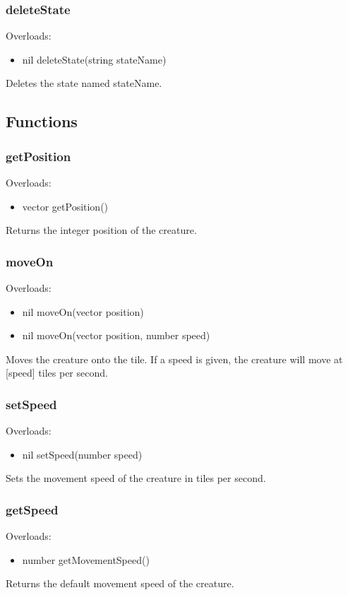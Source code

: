 \documentclass{book}
\newenvironment{ulist}
	{\begin{itemize}
			\itemsep0em}
	{\end{itemize}}
\begin{document}
\subsubsection{deleteState}
Overloads:
\begin{ulist}
	\item nil deleteState(string stateName)
\end{ulist}
Deletes the state named stateName.

\subsection{Functions}
\subsubsection{getPosition}
Overloads:
\begin{ulist}
	\item vector getPosition()
\end{ulist}
Returns the integer position of the creature.

\subsubsection{moveOn}
Overloads:
\begin{ulist}
	\item nil moveOn(vector position)
	\item nil moveOn(vector position, number speed)
\end{ulist}
Moves the creature onto the tile. If a speed is given, the creature will move at [speed] tiles per second.

\subsubsection{setSpeed}
Overloads:
\begin{ulist}
	\item nil setSpeed(number speed)
\end{ulist}
Sets the movement speed of the creature in tiles per second.

\subsubsection{getSpeed}
Overloads:
\begin{ulist}
	\item number getMovementSpeed()
\end{ulist}
Returns the default movement speed of the creature.
\end{document}
